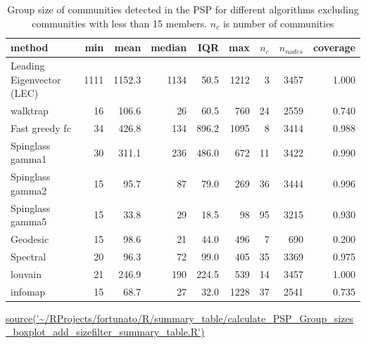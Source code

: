 \begin{table}[ht]
\centering
\setlength{\extrarowheight}{2pt}
\begin{tabular}{lrrrrrrrr}
  \toprule
method & min & mean & median & IQR & max & $n_c$ & $n_{nodes}$ & coverage \\ 
  \midrule
Leading Eigenvector (LEC) & 1111 & 1152.3 & 1134 & 50.5 & 1212 & 3 & 3457 & 1.000 \\ 
  walktrap & 16 & 106.6 & 26 & 60.5 & 760 & 24 & 2559 & 0.740 \\ 
  Fast greedy fc & 34 & 426.8 & 134 & 896.2 & 1095 & 8 & 3414 & 0.988 \\ 
  Spinglass gamma1 & 30 & 311.1 & 236 & 486.0 & 672 & 11 & 3422 & 0.990 \\ 
  Spinglass gamma2 & 15 & 95.7 & 87 & 79.0 & 269 & 36 & 3444 & 0.996 \\ 
  Spinglass gamma5 & 15 & 33.8 & 29 & 18.5 & 98 & 95 & 3215 & 0.930 \\ 
  Geodesic & 15 & 98.6 & 21 & 44.0 & 496 & 7 & 690 & 0.200 \\ 
  Spectral & 20 & 96.3 & 72 & 99.0 & 405 & 35 & 3369 & 0.975 \\ 
  louvain & 21 & 246.9 & 190 & 224.5 & 539 & 14 & 3457 & 1.000 \\ 
  infomap & 15 & 68.7 & 27 & 32.0 & 1228 & 37 & 2541 & 0.735 \\ 
   \bottomrule
\end{tabular}
\caption[Size of communities detected in PSP for different algorithms]{Group size of communities detected in the PSP for different algorithms excluding communities with less than 15 members. $n_c$ is number of communities} 
\tiny\url{source('~/RProjects/fortunato/R/summary_table/calculate_PSP_Group_sizes_boxplot_add_sizefilter_summary_table.R')}
\label{tab:Group size of clusters excluding gene sets size less than 15}
\end{table}



